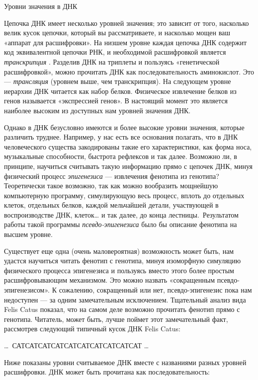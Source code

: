 \documentclass[../main.tex]{subfiles}
\begin{document}
Уровни значения в ДНК

Цепочка ДНК имеет несколько уровней значения; это зависит от того, насколько велик кусок цепочки, который вы рассматриваете, и насколько мощен ваш «аппарат для расшифровки». На низшем уровне каждая цепочка ДНК содержит код эквивалентной цепочки РНК, и необходимой расшифровкой является \emph{транскрипция} . Разделив ДНК на триплеты и пользуясь «генетической расшифровкой», можно прочитать ДНК как последовательность аминокислот. Это --- \emph{трансляция} (уровнем выше, чем транскрипция). На следующем уровне иерархии ДНК читается как набор белков. Физическое извлечение белков из генов называется «экспрессией генов». В настоящий момент это является наиболее высоким из доступных нам уровней значения ДНК.

Однако в ДНК безусловно имеются и более высокие уровни значения, которые различить труднее. Например, у нас есть все основания полагать, что в ДНК человеческого существа закодированы такие его характеристики, как форма носа, музыкальные способности, быстрота рефлексов и так далее. Возможно ли, в принципе, научиться считывать такую информацию прямо с цепочек ДНК, минуя физический процесс \emph{эпигенезиса} --- извлечения фенотипа из генотипа? Теоретически такое возможно, так как можно вообразить мощнейшую компьютерную программу, симулирующую весь процесс, вплоть до отдельных клеток, отдельных белков, каждой мельчайшей детали, участвующей в воспроизводстве ДНК, клеток\ldots{} и так далее, до конца лестницы.~Результатом работы такой программы \emph{псевдо-эпигенезиса} было бы описание фенотипа на высшем уровне.

Существует еще одна (очень маловероятная) возможность может быть, нам удастся научиться читать фенотип с генотипа, минуя изоморфную симуляцию физического процесса эпигенезиса и пользуясь вместо этого более простым расшифровывающим механизмом. Это можно назвать «сокращенным псевдо-эпигенезисом». К сожалению, сокращенный или нет, псевдо-эпигенезис пока нам недоступен --- за одним замечательным исключением. Тщательный анализ вида Felis Catus показал, что на самом деле возможно прочитать фенотип прямо с генотипа. Читатель, может быть, лучше поймет этот замечательный факт, рассмотрев следующий типичный кусок ДНК Felis Catus:

\ldots~САТСАТСАТСАТСАТСАТСАТСАТСАТСАТ \ldots{}

Ниже показаны уровни считываемое ДНК вместе с названиями разных уровней расшифровки. ДНК может быть прочитана как последовательность:
\end{document}
